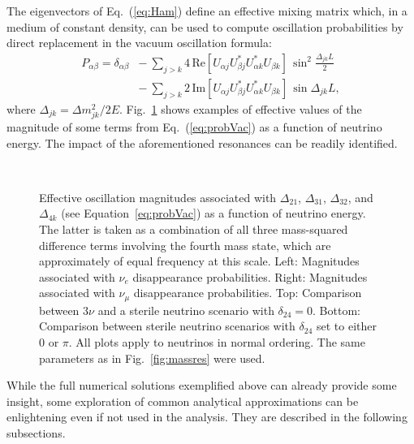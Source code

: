 The eigenvectors of Eq.~(\ref{eq:Ham}) define an effective mixing matrix which, in a medium of constant density, can be used to compute oscillation probabilities by direct replacement in the vacuum oscillation formula:
\begin{equation}
    \label{eq:probVac}
    \begin{array}{rl}
    P_{\alpha\beta}=\delta_{\alpha\beta}&-\ \sum_{j>k}4\,\mathrm{Re}[U_{\alpha{j}}U^*_{\beta{j}}U^*_{\alpha{k}}U_{\beta{k}}]\,\sin^2\frac{\Delta_{jk}L}{2}\\
    &-\ \sum_{j>k}2\,\mathrm{Im}[U_{\alpha{j}}U^*_{\beta{j}}U^*_{\alpha{k}}U_{\beta{k}}]\,\sin\Delta_{jk}L,
    \end{array}
\end{equation}
\noindent where $\Delta_{jk}=\Delta{m^2_{jk}}/2E$. Fig.~\ref{fig:mixres} shows examples of effective values of the magnitude of some terms from Eq.~(\ref{eq:probVac}) as a function of neutrino energy. The impact of the aforementioned resonances can be readily identified.
\begin{figure}
    \centering
    \\
    \caption{Effective oscillation magnitudes associated with $\Delta_{21}$, $\Delta_{31}$, $\Delta_{32}$, and $\Delta_{4k}$ (see Equation~\ref{eq:probVac}) as a function of neutrino energy. The latter is taken as a combination of all three mass-squared difference terms involving the fourth mass state, which are approximately of equal frequency at this scale. Left: Magnitudes associated with $\nu_e$ disappearance probabilities. Right: Magnitudes associated with $\nu_\mu$ disappearance probabilities. Top: Comparison between 3$\nu$ and a sterile neutrino scenario with $\delta_{24}=0$. Bottom: Comparison between sterile neutrino scenarios with $\delta_{24}$ set to either $0$ or $\pi$. All plots apply to neutrinos in normal ordering. The same parameters as in Fig.~\ref{fig:massres} were used.}
    \label{fig:mixres}
\end{figure}
While the full numerical solutions exemplified above can already provide some insight, some exploration of common analytical approximations can be enlightening even if not used in the analysis. They are described in the following subsections.

